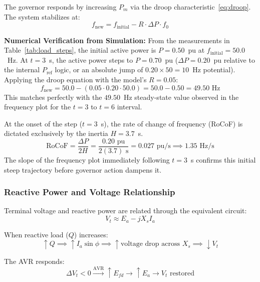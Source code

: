 \documentclass[12pt, a4paper]{article}
\begin{document}
The governor responds by increasing $P_m$ via the droop characteristic~\eqref{eq:droop}. The system stabilizes at:
\begin{equation}
    f_{\text{new}} = f_{\text{initial}} - R \cdot \Delta P \cdot f_0
    \label{eq:freq_drop}
\end{equation}

\textbf{Numerical Verification from Simulation:}
From the measurements in Table~\ref{tab:load_steps}, the initial active power is $P = 0.50$~pu at $f_{\text{initial}} = 50.0$~Hz. At $t = 3$~s, the active power steps to $P = 0.70$~pu ($\Delta P = 0.20$~pu relative to the internal $P_{\text{ref}}$ logic, or an absolute jump of $0.20 \times 50 = 10$~Hz potential).
Applying the droop equation with the model's $R = 0.05$:
\begin{equation}
    f_{\text{new}} = 50.0 - (0.05 \cdot 0.20 \cdot 50.0) = 50.0 - 0.50 = 49.50\text{ Hz}
\end{equation}
This matches perfectly with the $49.50$~Hz steady-state value observed in the frequency plot for the $t=3$ to $t=6$ interval.

At the onset of the step ($t=3$~s), the rate of change of frequency (RoCoF) is dictated exclusively by the inertia $H = 3.7$~s.
\begin{equation}
    \text{RoCoF} = \frac{\Delta P}{2H} = \frac{0.20\text{ pu}}{2(3.7)\text{ s}} = 0.027\text{ pu/s} \implies 1.35\text{ Hz/s}
\end{equation}
The slope of the frequency plot immediately following $t=3$~s confirms this initial steep trajectory before governor action dampens it.

\subsubsection{Reactive Power and Voltage Relationship}

Terminal voltage and reactive power are related through the equivalent circuit:
\begin{equation}
    V_t \approx E_a - j X_s I_a
    \label{eq:vt_drop}
\end{equation}

When reactive load ($Q$) increases:
\begin{equation}
    \uparrow Q \implies \uparrow I_a \sin\phi \implies \uparrow \text{voltage drop across } X_s \implies \downarrow V_t
\end{equation}

The AVR responds:
\begin{equation}
    \Delta V_t < 0 \xrightarrow{\text{AVR}} \uparrow E_{fd} \xrightarrow{} \uparrow E_a \xrightarrow{} V_t \text{ restored}
\end{equation}
\end{document}
